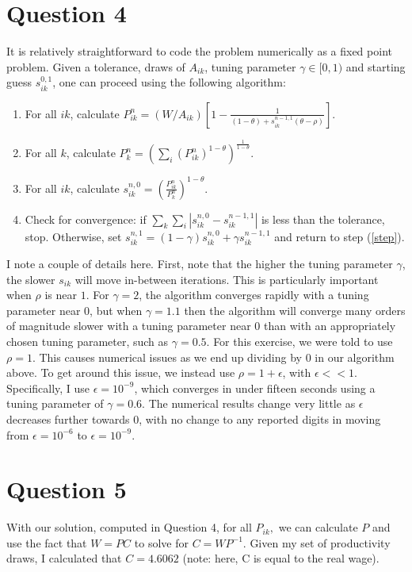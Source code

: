 \documentclass[11pt]{article} %
\begin{document}
\section{Question 4}
It is relatively straightforward to code the problem numerically as a fixed point problem. Given a tolerance, draws of $A_{ik}$, tuning parameter $\gamma \in [0,1)$ and starting guess $s_{ik}^{0,1}$, one can proceed using the following algorithm:
\begin{enumerate}
\item For all $ik$, calculate $P_{ik}^{n} = (W/A_{ik})\left[1 - \frac{1}{(1-\theta) +  s_{ik}^{n-1,1} (\theta - \rho)} \right]$. \label{step}
\item For all $k$, calculate $P_{k}^{n} = \left( \sum_i (P_{ik}^{n})^{1-\theta} \right)^{\frac{1}{1-\theta}} $.
\item For all $ik$, calculate $s_{ik}^{n,0} = \left(\frac{P_{ik}^{n}}{P_{k}^n}\right)^{1-\theta}$.
\item Check for convergence: if $\sum_{k}\sum_{i}|s_{ik}^{n,0} - s_{ik}^{n-1,1}|$ is less than the tolerance, stop. Otherwise, set $s_{ik}^{n,1} = (1-\gamma) s_{ik}^{n,0} +  \gamma s_{ik}^{n-1,1}$ and return to step (\ref{step}).
\end{enumerate}

I note a couple of details here. First, note that the higher the tuning parameter $\gamma$, the slower $s_{ik}$ will move in-between iterations. This is particularly important when $\rho$ is near $1$. For $\gamma = 2$, the algorithm converges rapidly with a tuning parameter near 0, but when $\gamma = 1.1$ then the algorithm will converge many orders of magnitude slower with a tuning parameter near 0 than with an appropriately chosen tuning parameter, such as $\gamma = 0.5$. For this exercise, we were told to use $\rho = 1.$ This causes numerical issues as we end up dividing by $0$ in our algorithm above. To get around this issue, we instead use $\rho = 1+ \epsilon$, with $\epsilon<<1$. Specifically, I use $\epsilon = 10^{-9}$, which converges in under fifteen seconds using a tuning parameter of $\gamma = 0.6.$ The numerical results change very little as $\epsilon$ decreases further towards $0$, with no change to any reported digits in moving from $\epsilon = 10^{-6}$ to $\epsilon = 10^{-9}$.

\section{Question 5}
With our solution, computed in Question 4, for all $P_{ik},$ we can calculate $P$ and use the fact that $W = PC$ to solve for $C = WP^{-1}$. Given my set of productivity draws, I calculated that $C = 4.6062 $ (note: here, C is equal to the real wage).
\end{document}

